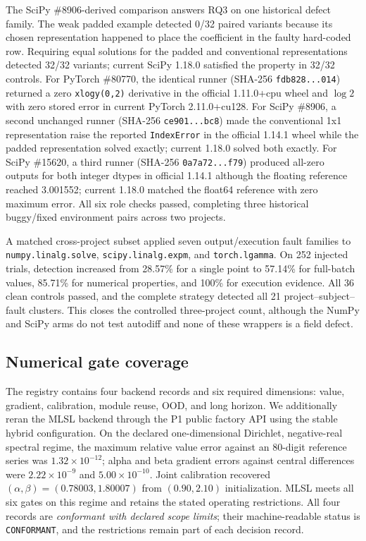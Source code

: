 \documentclass[preprint,12pt]{elsarticle}
\begin{document}
The SciPy \#8906-derived comparison answers RQ3 on one historical defect family. The weak padded example detected 0/32 paired variants because its chosen representation happened to place the coefficient in the faulty hard-coded row. Requiring equal solutions for the padded and conventional representations detected 32/32 variants; current SciPy 1.18.0 satisfied the property in 32/32 controls. For PyTorch \#80770, the identical runner (SHA-256 \texttt{fdb828...014}) returned a zero \texttt{xlogy(0,2)} derivative in the official 1.11.0+cpu wheel and $\log 2$ with zero stored error in current PyTorch 2.11.0+cu128. For SciPy \#8906, a second unchanged runner (SHA-256 \texttt{ce901...bc8}) made the conventional 1x1 representation raise the reported \texttt{IndexError} in the official 1.14.1 wheel while the padded representation solved exactly; current 1.18.0 solved both exactly. For SciPy \#15620, a third runner (SHA-256 \texttt{0a7a72...f79}) produced all-zero outputs for both integer dtypes in official 1.14.1 although the floating reference reached 3.001552; current 1.18.0 matched the float64 reference with zero maximum error. All six role checks passed, completing three historical buggy/fixed environment pairs across two projects.

A matched cross-project subset applied seven output/execution fault families to \texttt{numpy.linalg.solve}, \texttt{scipy.linalg.expm}, and \texttt{torch.lgamma}. On 252 injected trials, detection increased from 28.57\% for a single point to 57.14\% for full-batch values, 85.71\% for numerical properties, and 100\% for execution evidence. All 36 clean controls passed, and the complete strategy detected all 21 project--subject--fault clusters. This closes the controlled three-project count, although the NumPy and SciPy arms do not test autodiff and none of these wrappers is a field defect.

\subsection{Numerical gate coverage}
The registry contains four backend records and six required dimensions: value, gradient, calibration, module reuse, OOD, and long horizon. We additionally reran the MLSL backend through the P1 public factory API using the stable hybrid configuration. On the declared one-dimensional Dirichlet, negative-real spectral regime, the maximum relative value error against an 80-digit reference series was $1.32\times10^{-12}$; alpha and beta gradient errors against central differences were $2.22\times10^{-9}$ and $5.00\times10^{-10}$. Joint calibration recovered $(\alpha,\beta)=(0.78003,1.80007)$ from $(0.90,2.10)$ initialization. MLSL meets all six gates on this regime and retains the stated operating restrictions. All four records are \emph{conformant with declared scope limits}; their machine-readable status is \texttt{CONFORMANT}, and the restrictions remain part of each decision record.
\end{document}
